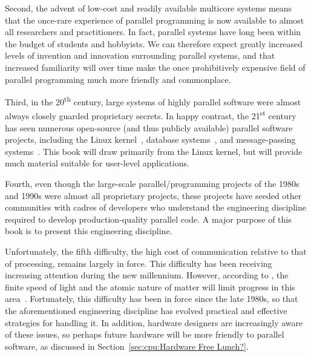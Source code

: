 Second, the advent of low-cost and readily available multicore systems
means that the once-rare experience of parallel programming is
now available to almost all researchers and practitioners.
In fact, parallel systems have long been within the budget of students
and hobbyists.
We can therefore expect greatly increased levels of invention and
innovation surrounding parallel systems, and that increased familiarity
will over time make the once prohibitively expensive field of parallel
programming much more friendly and commonplace.

Third, in the 20\textsuperscript{th} century, large systems of
highly parallel software were almost always closely guarded proprietary
secrets.
In happy contrast, the 21\textsuperscript{st} century has seen numerous
open-source (and thus publicly available) parallel software projects,
including the Linux kernel~\cite{Torvalds2.6kernel},
database systems~\cite{PostgreSQL2008,MySQL2008},
and message-passing systems~\cite{OpenMPI2008,BOINC2008}.
This book will draw primarily from the Linux kernel, but will
provide much material suitable for user-level applications.

Fourth, even though the large-scale parallel\-/programming projects of
the 1980s and 1990s were almost all proprietary projects, these
projects have seeded other communities with cadres of developers who
understand the engineering discipline required to develop production-quality
parallel code.
A major purpose of this book is to present this engineering discipline.

Unfortunately, the fifth difficulty, the high cost of communication
relative to that of processing, remains largely in force.
This difficulty has been receiving increasing attention during
the new millennium.
However, according to ,
the finite speed of light and the atomic
nature of matter will limit progress in this
area~\cite{BryanGardiner2007,GordonMoore03a}.
Fortunately, this difficulty has been in force since the late 1980s,
so that the aforementioned engineering discipline has evolved practical
and effective strategies for handling it.
In addition, hardware designers are increasingly aware of these issues,
so perhaps future hardware will be more friendly to parallel software,
as discussed in Section~\ref{sec:cpu:Hardware Free Lunch?}.

